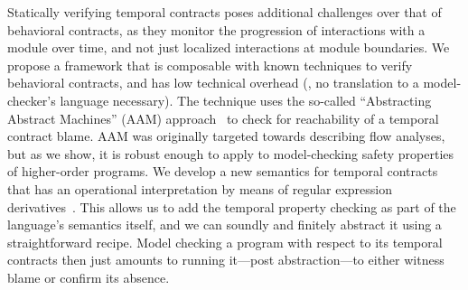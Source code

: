Statically verifying temporal contracts poses additional challenges
over that of behavioral contracts, as they monitor the progression of
interactions with a module over time, and not just localized
interactions at module boundaries.
%
We propose a framework that is composable with known techniques to
verify behavioral contracts, and has low technical overhead (\eg, no
translation to a model-checker's language necessary).
%
The technique uses the so-called ``Abstracting Abstract Machines''
(AAM) approach~\citep{dvanhorn:VanHorn2010Abstracting} to check for
reachability of a temporal contract blame.
AAM was originally targeted towards describing flow analyses, but as
we show, it is robust enough to apply to model-checking safety
properties of higher-order programs.
%
We develop a new semantics for temporal contracts that has an operational interpretation by means of regular expression derivatives~\citep{ianjohnson:Brzozowski1964}.
%
This allows us to add the temporal property checking as part of the
language's semantics itself, and we can soundly and finitely abstract
it using a straightforward recipe.
%
Model checking a program with respect to its temporal contracts then
just amounts to running it---post abstraction---to either witness
blame or confirm its absence.


